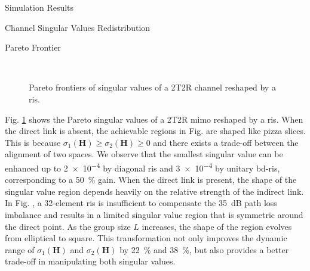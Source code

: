 \documentclass[journal]{IEEEtran}
\begin{document}
\begin{section}{Simulation Results}
	\begin{subsection}{Channel Singular Values Redistribution}
		\begin{subsubsection}{Pareto Frontier}
			\begin{figure}[!t]
				\centering
				\\
				\caption{Pareto frontiers of singular values of a 2T2R channel reshaped by a \gls{ris}.}
				\label{fg:singular_pareto}
			\end{figure}
			Fig. \ref{fg:singular_pareto} shows the Pareto singular values of a 2T2R \gls{mimo} reshaped by a \gls{ris}.
			When the direct link is absent, the achievable regions in Fig.  are shaped like pizza slices.
			This is because $\sigma_1(\mathbf{H}) \ge \sigma_2(\mathbf{H}) \ge 0$ and there exists a trade-off between the alignment of two spaces.
			We observe that the smallest singular value can be enhanced up to \num{2e-4} by diagonal \gls{ris} and \num{3e-4} by unitary \gls{bd}-\gls{ris}, corresponding to a \qty{50}{\percent} gain.
			When the direct link is present, the shape of the singular value region depends heavily on the relative strength of the indirect link.
			In Fig. , a 32-element \gls{ris} is insufficient to compensate the \qty{35}{dB} path loss imbalance and results in a limited singular value region that is symmetric around the direct point.
			As the group size $L$ increases, the shape of the region evolves from elliptical to square.
			This transformation not only improves the dynamic range of $\sigma_1(\mathbf{H})$ and $\sigma_2(\mathbf{H})$ by \qty{22}{\percent} and \qty{38}{\percent}, but also provides a better trade-off in manipulating both singular values.

\end{subsubsection}
\end{subsection}
\end{section}
\end{document}
